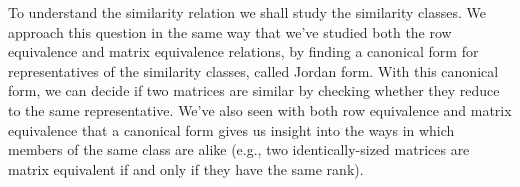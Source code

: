 To understand the similarity relation we shall study the similarity classes.
We approach this question in the same way that we've studied both the
row equivalence and matrix equivalence relations, by finding
a canonical form for
representatives %
of the similarity classes, called Jordan form.
With this canonical form, we can decide if two matrices are similar by checking
whether they reduce to the same representative.
We've also seen with both row equivalence and matrix equivalence that a
canonical form gives us insight into the ways in which members of
the same class are alike
(e.g., two identically-sized matrices are matrix equivalent
if and only if they have the same rank).

